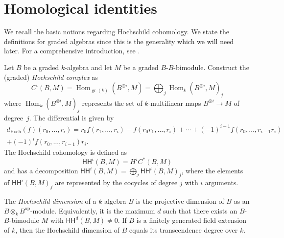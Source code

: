 \documentclass{amsart}
\numberwithin{equation}{section}
\theoremstyle{definition}
\theoremstyle{remark}
\begin{document}
\section{Homological identities}
We recall the basic notions regarding Hochschild cohomology. We state the definitions
for graded algebras since this is the generality which we will need later. For a
comprehensive introduction, see \cite{Weibel}. 

Let $B$ be a graded
$k$-algebra and let $M$ be a graded $B$-$B$-bimodule. Construct the
(graded) \emph{Hochschild complex} as
$$C^i(B,M)={\operatorname {Hom}}_{{\operatorname {gr}}(k)}(B^{\otimes i}, M)=\bigoplus_j {\operatorname {Hom}}_k(B^{\otimes i},M)_j$$
where ${\operatorname {Hom}}_k(B^{\otimes i},M)_j$ represents the set of $k$-multilinear maps $B^{\otimes i}\to M$ of degree~$j$. The differential is given by 
\begin{multline*}
d_{\text{Hoch}}(f)(r_0,\ldots, r_i)=r_0f(r_1,\ldots,r_i)-f(r_0r_1,\ldots,r_i)+\cdots +(-1)^{i-1} f(r_0,\ldots,r_{i-1}r_i)\\+(-1)^i f(r_0,\ldots,r_{i-1})r_i.
\end{multline*}
The Hochschild cohomology is defined as
$${\mathsf{HH}}^i(B,M)=H^iC^*(B,M)$$
and has a decomposition ${\mathsf{HH}}^i(B,M)=\bigoplus_j {\mathsf{HH}}^i(B,M)_j$, where the elements of ${\mathsf{HH}}^i(B,M)_j$ are represented by the cocycles of degree $j$ with $i$ arguments.

The \emph{Hochschild dimension} of a $k$-algebra $B$ is the projective
dimension of $B$ as an $B\otimes_k
B^{\text{op}}$-module. Equivalently, it is the maximum $d$ such that
there exists an $B$-$B$-bimodule $M$ with ${\mathsf{HH}}^d(B,M)\neq 0$. If $B$
is a finitely generated field extension of $k$, then \cite{Osofsky}
the Hochschild dimension of $B$ equals its transcendence degree over
$k$.

\medskip
\end{document}
